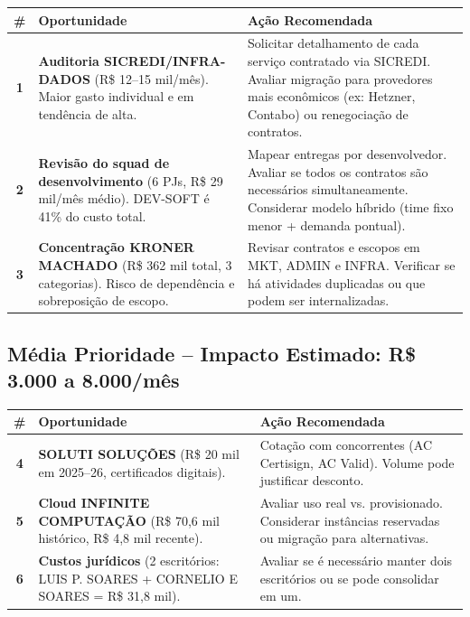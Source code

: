 \documentclass[12pt, a4paper]{article}
\begin{document}
\begin{table}[H]
    \centering
    \renewcommand{\arraystretch}{1.5}
    \begin{tabularx}{\textwidth}{c X X}
        \toprule
        \rowcolor{accentColor!15} \textbf{\#} & \textbf{Oportunidade} & \textbf{Ação Recomendada} \\
        \midrule
        \textbf{1} & \textbf{Auditoria SICREDI/INFRA-DADOS} (R\$ 12--15 mil/mês). Maior gasto individual e em tendência de alta. & Solicitar detalhamento de cada serviço contratado via SICREDI. Avaliar migração para provedores mais econômicos (ex: Hetzner, Contabo) ou renegociação de contratos. \\
        \midrule
        \textbf{2} & \textbf{Revisão do squad de desenvolvimento} (6 PJs, R\$ 29 mil/mês médio). DEV-SOFT é 41\% do custo total. & Mapear entregas por desenvolvedor. Avaliar se todos os contratos são necessários simultaneamente. Considerar modelo híbrido (time fixo menor + demanda pontual). \\
        \midrule
        \textbf{3} & \textbf{Concentração KRONER MACHADO} (R\$ 362 mil total, 3 categorias). Risco de dependência e sobreposição de escopo. & Revisar contratos e escopos em MKT, ADMIN e INFRA. Verificar se há atividades duplicadas ou que podem ser internalizadas. \\
        \bottomrule
    \end{tabularx}
\end{table}

\subsection{Média Prioridade -- Impacto Estimado: R\$ 3.000 a 8.000/mês}

\begin{table}[H]
    \centering
    \renewcommand{\arraystretch}{1.5}
    \begin{tabularx}{\textwidth}{c X X}
        \toprule
        \rowcolor{warningOrange!15} \textbf{\#} & \textbf{Oportunidade} & \textbf{Ação Recomendada} \\
        \midrule
        \textbf{4} & \textbf{SOLUTI SOLUÇÕES} (R\$ 20 mil em 2025--26, certificados digitais). & Cotação com concorrentes (AC Certisign, AC Valid). Volume pode justificar desconto. \\
        \midrule
        \textbf{5} & \textbf{Cloud INFINITE COMPUTAÇÃO} (R\$ 70,6 mil histórico, R\$ 4,8 mil recente). & Avaliar uso real vs. provisionado. Considerar instâncias reservadas ou migração para alternativas. \\
        \midrule
        \textbf{6} & \textbf{Custos jurídicos} (2 escritórios: LUIS P. SOARES + CORNELIO E SOARES = R\$ 31,8 mil). & Avaliar se é necessário manter dois escritórios ou se pode consolidar em um. \\
        \bottomrule
    \end{tabularx}
\end{table}
\end{document}

